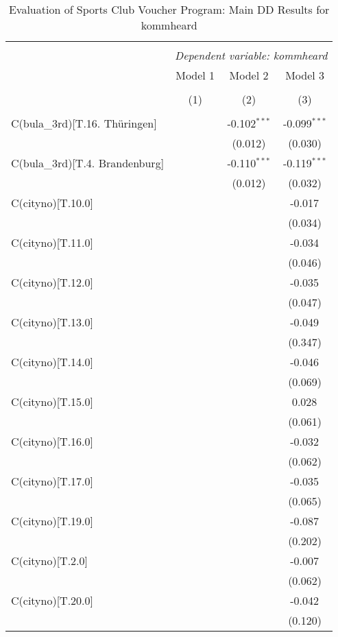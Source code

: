 \begin{table}[!htbp] \centering
  \caption{Evaluation of Sports Club Voucher Program: Main DD Results for kommheard}
\begin{tabular}{@{\extracolsep{5pt}}lccc}
\\[-1.8ex]\hline
\hline \\[-1.8ex]
& \multicolumn{3}{c}{\textit{Dependent variable: kommheard}} \
\cr \cline{2-4}
\\[-1.8ex] & \multicolumn{1}{c}{Model 1} & \multicolumn{1}{c}{Model 2} & \multicolumn{1}{c}{Model 3}  \\
\\[-1.8ex] & (1) & (2) & (3) \\
\hline \\[-1.8ex]
 C(bula_3rd)[T.16. Thüringen] & & -0.102$^{***}$ & -0.099$^{***}$ \\
& & (0.012) & (0.030) \\
 C(bula_3rd)[T.4. Brandenburg] & & -0.110$^{***}$ & -0.119$^{***}$ \\
& & (0.012) & (0.032) \\
 C(cityno)[T.10.0] & & & -0.017$^{}$ \\
& & & (0.034) \\
 C(cityno)[T.11.0] & & & -0.034$^{}$ \\
& & & (0.046) \\
 C(cityno)[T.12.0] & & & -0.035$^{}$ \\
& & & (0.047) \\
 C(cityno)[T.13.0] & & & -0.049$^{}$ \\
& & & (0.347) \\
 C(cityno)[T.14.0] & & & -0.046$^{}$ \\
& & & (0.069) \\
 C(cityno)[T.15.0] & & & 0.028$^{}$ \\
& & & (0.061) \\
 C(cityno)[T.16.0] & & & -0.032$^{}$ \\
& & & (0.062) \\
 C(cityno)[T.17.0] & & & -0.035$^{}$ \\
& & & (0.065) \\
 C(cityno)[T.19.0] & & & -0.087$^{}$ \\
& & & (0.202) \\
 C(cityno)[T.2.0] & & & -0.007$^{}$ \\
& & & (0.062) \\
 C(cityno)[T.20.0] & & & -0.042$^{}$ \\
& & & (0.120) \\

\end{tabular}
\end{table}
